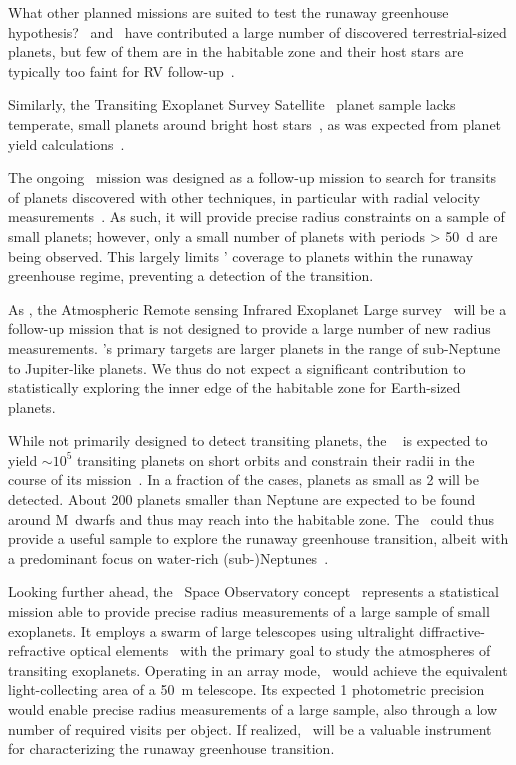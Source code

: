 \documentclass[twocolumn]{aastex631}
\begin{document}
What other planned missions are suited to test the runaway greenhouse hypothesis?
\kepler\ and \ktwo\ have contributed a large number of discovered terrestrial-sized planets, but few of them are in the habitable zone and their host stars are typically too faint for RV follow-up~\citep{Dressing2015}.

Similarly, the Transiting Exoplanet Survey Satellite~\citep[\tess,][]{Ricker2014a} planet sample lacks temperate, small planets around bright host stars~\citep{Ment2023}, as was expected from planet yield calculations~\citep{Barclay2018}.

The ongoing \cheops\ mission was designed as a follow-up mission to search for transits of planets discovered with other techniques, in particular with radial velocity measurements~\citep{Benz2021}.
As such, it will provide precise radius constraints on a sample of small planets; however, only a small number of planets with periods \SI{> 50}{\day} are being observed.
This largely limits \cheops' coverage to planets within the runaway greenhouse regime, preventing a detection of the transition.

As \cheops, the Atmospheric Remote sensing Infrared Exoplanet Large survey~\citep[\ariel,][]{Puig2016} will be a follow-up mission that is not designed to provide a large number of new radius measurements.
\ariel's primary targets are larger planets in the range of sub-Neptune to Jupiter-like planets.
We thus do not expect a significant contribution to statistically exploring the inner edge of the habitable zone for Earth-sized planets.

While not primarily designed to detect transiting planets, the \rst~\citep{Spergel2015} is expected to yield $\sim 10^5$ transiting planets on short orbits and constrain their radii in the course of its mission~\citep{Montet2017}.
In a fraction of the cases, planets as small as \SI{2}{\Rearth} will be detected.
About 200 planets smaller than Neptune are expected to be found around M~dwarfs and thus may reach into the habitable zone.
The \rst\ could thus provide a useful sample to explore the runaway greenhouse transition, albeit with a predominant focus on water-rich (sub-)Neptunes~\citep[e.g.,][]{Pierrehumbert2022}.

Looking further ahead, the \nautilus\ Space Observatory concept~\citep{Apai2019} represents a statistical mission able to provide precise radius measurements of a large sample of small exoplanets.
It employs a swarm of large telescopes using ultralight diffractive-refractive optical elements~\citep{Milster2020} with the primary goal to study the atmospheres of transiting exoplanets.
Operating in an array mode, \nautilus\ would achieve the equivalent light-collecting area of a \SI{50}{\meter} telescope.
Its expected \SI{1}{\ppm} photometric precision~\citep{Apai2022} would enable precise radius measurements of a large sample, also through a low number of required visits per object.
If realized, \nautilus\ will be a valuable instrument for characterizing the runaway greenhouse transition.
\end{document}
